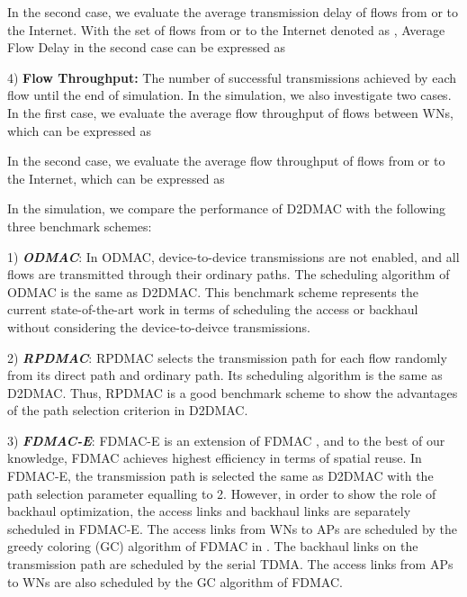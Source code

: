 \documentclass[journal]{IEEEtran}
\begin{document}
In the second case, we evaluate the average transmission delay of flows from or to the Internet.
With the set of flows from or to the Internet denoted as , Average Flow Delay in the
second case can be expressed as







4) \textbf{Flow Throughput:} The number of successful transmissions achieved by each flow until the
end of simulation. In the simulation, we also investigate two cases. In the first case, we evaluate
the average flow throughput of flows between WNs, which can be expressed as





In the second case, we evaluate the average flow throughput of flows from or to the Internet, which
can be expressed as








In the simulation, we compare the performance of D2DMAC with the following three benchmark schemes:

1) \emph{\textbf{ODMAC}}: In ODMAC, device-to-device transmissions are not enabled, and all flows
are transmitted through their ordinary paths. The scheduling algorithm of ODMAC is the same as
D2DMAC. This benchmark scheme represents the current state-of-the-art work in terms of scheduling
the access or backhaul without considering the device-to-deivce
transmissions\cite{mao,60GHz-backhaul-1, 60GHz-backhaul-4}.

2) \textbf{\emph{RPDMAC}}: RPDMAC selects the transmission path for each flow randomly from its
direct path and ordinary path. Its scheduling algorithm is the same as D2DMAC. Thus, RPDMAC is a
good benchmark scheme to show the advantages of the path selection criterion in D2DMAC.


3) \textbf{\emph{FDMAC-E}}: FDMAC-E is an extension of FDMAC \cite{mao}, and to the best of our knowledge, FDMAC achieves highest efficiency in terms of spatial reuse. In FDMAC-E, the transmission path is selected the same as D2DMAC with the path selection
parameter  equalling to 2. However, in order to show the role of backhaul optimization, the access links and backhaul links are separately scheduled in FDMAC-E. The access links from WNs to APs are scheduled by the greedy coloring (GC) algorithm of FDMAC in \cite{mao}. The backhaul links on the transmission path are scheduled by the serial TDMA. The access links from APs to WNs are also scheduled by the GC algorithm of FDMAC.
\end{document}
